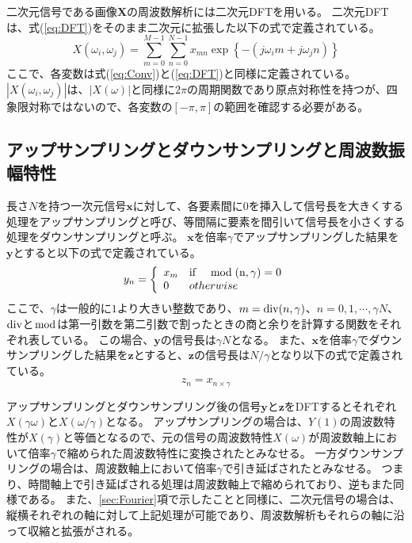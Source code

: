 \documentclass[11pt,a4paper]{jsarticle}
\begin{document}
二次元信号である画像$\mathbf{X}$の周波数解析には二次元DFTを用いる。
二次元DFTは、式(\ref{eq:DFT})をそのまま二次元に拡張した以下の式で定義されている。
\begin{equation}
	X(\omega_i, \omega_j)=
	\sum^{M-1}_{m=0}\sum^{N-1}_{n=0}x_{mn}
	\exp\left\{-\left(j\omega_i m+j\omega_j n\right)\right\}
	\label{eq:2DDFT}
\end{equation}
ここで、各変数は式(\ref{eq:Conv})と(\ref{eq:DFT})と同様に定義されている。
$|X(\omega_i, \omega_j)|$は、$|X(\omega)|$と同様に$2\pi$の周期関数であり原点対称性を持つが、四象限対称ではないので、各変数の$[-\pi, \pi]$の範囲を確認する必要がある。


\subsection{アップサンプリングとダウンサンプリングと周波数振幅特性}
\label{sec:UpDonwsampling}
長さ$N$を持つ一次元信号$\bm{x}$に対して、各要素間に$0$を挿入して信号長を大きくする処理をアップサンプリングと呼び、等間隔に要素を間引いて信号長を小さくする処理をダウンサンプリングと呼ぶ。
$\bm{x}$を倍率$\gamma$でアップサンプリングした結果を$\bm{y}$とすると以下の式で定義されている。
\begin{equation}
	y_n=\left\{
	\begin{array}{ll}
		x_{m}&\rm{if}\quad \bmod(n, \gamma) =0\\
		0&otherwise
	\end{array}
	\right.
\end{equation}
ここで、$\gamma$は一般的に$1$より大きい整数であり、$m={\rm div}(n, \gamma)$、$n=0,1,\cdots,\gamma N$、${\rm div}$と$\bmod$は第一引数を第二引数で割ったときの商と余りを計算する関数をそれぞれ表している。
この場合、$\bm{y}$の信号長は$\gamma N$となる。
また、$\bm{x}$を倍率$\gamma$でダウンサンプリングした結果を$\bm{z}$とすると、$\bm{z}$の信号長は$N/\gamma$となり以下の式で定義されている。
\begin{equation}
	z_n=x_{n\times\gamma}
\end{equation}

アップサンプリングとダウンサンプリング後の信号$\bm{y}$と$\bm{z}$をDFTするとそれぞれ$X(\gamma\omega)$と$X(\omega/\gamma)$となる。
アップサンプリングの場合は、$Y(1)$の周波数特性が$X(\gamma)$と等価となるので、元の信号の周波数特性$X(\omega)$が周波数軸上において倍率$\gamma$で縮められた周波数特性に変換されたとみなせる。
一方ダウンサンプリングの場合は、周波数軸上において倍率$\gamma$で引き延ばされたとみなせる。
つまり、時間軸上で引き延ばされる処理は周波数軸上で縮められており、逆もまた同様である。
また、\ref{sec:Fourier}項で示したことと同様に、二次元信号の場合は、縦横それぞれの軸に対して上記処理が可能であり、周波数解析もそれらの軸に沿って収縮と拡張がされる。
\end{document}
